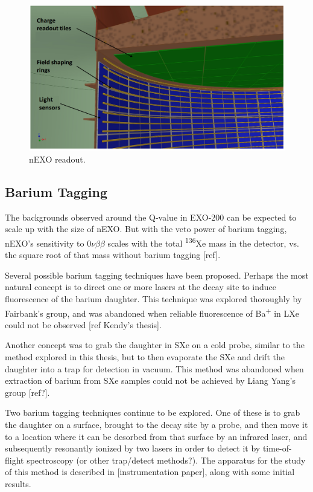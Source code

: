 \begin{figure}[H]
	\centering
	\includegraphics[width=.7\textwidth]{figures/nEXO_readout.png}
	\caption{nEXO readout.}
\label{fig:nEXO_readout}
\end{figure}

\subsection{Barium Tagging}

The backgrounds observed around the Q-value in EXO-200 can be expected to scale up with the size of nEXO.  But with the veto power of barium tagging, nEXO's sensitivity to $0\nu\beta\beta$ scales with the total \textsuperscript{136}Xe mass in the detector, vs. the square root of that mass without barium tagging [ref].

Several possible barium tagging techniques have been proposed.  Perhaps the most natural concept is to direct one or more lasers at the decay site to induce fluorescence of the barium daughter.  This technique was explored thoroughly by Fairbank's group, and was abandoned when reliable fluorescence of Ba\textsuperscript{+} in LXe could not be observed [ref Kendy's thesis].

Another concept was to grab the daughter in SXe on a cold probe, similar to the method explored in this thesis, but to then evaporate the SXe and drift the daughter into a trap for detection in vacuum.  This method was abandoned when extraction of barium from SXe samples could not be achieved by Liang Yang's group [ref?].

Two barium tagging techniques continue to be explored.  One of these is to grab the daughter on a surface, brought to the decay site by a probe, and then move it to a location where it can be desorbed from that surface by an infrared laser, and subsequently resonantly ionized by two lasers in order to detect it by time-of-flight spectroscopy {\color{red}(or other trap/detect methods?)}.  The apparatus for the study of this method is described in [instrumentation paper], along with some initial results.

